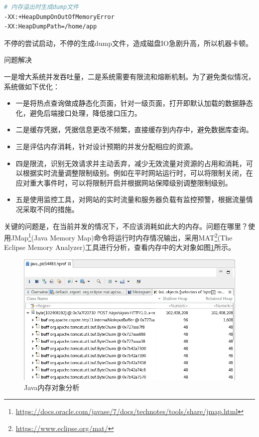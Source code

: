 \documentclass[8pt]{book}
\makeatletter
\numberwithin{dummy}{section}
\theoremstyle{ocrenumbox}
\theoremstyle{blacknumex}
\theoremstyle{blacknumbox}
\theoremstyle{ocrenum}
\renewcommand\paragraph{\@startsection{paragraph}{4}{\z@}
	{-2ex \@plus-.2ex \@minus .2ex}
	{.1ex}
	{\normalfont\small\sffamily\bfseries}}
\makeatother
\begin{document}
\begin{lstlisting}[language=Bash]
# 内存溢出时生成dump文件
-XX:+HeapDumpOnOutOfMemoryError 
-XX:HeapDumpPath=/home/app
\end{lstlisting}

不停的尝试启动，不停的生成dump文件，造成磁盘IO急剧升高，所以机器卡顿。

\paragraph{问题解决}

一是增大系统并发吞吐量，二是系统需要有限流和熔断机制。为了避免类似情况，系统做如下优化：

\begin{itemize}
	\item {一是将热点查询做成静态化页面，针对一级页面，打开即默认加载的数据静态化，避免后端接口处理，降低接口压力。}
	\item {二是缓存凭据，凭据信息更改不频繁，直接缓存到内存中，避免数据库查询。}
	\item {三是评估内存消耗，针对设计预期的并发分配相应的资源。}
	\item{四是限流，识别无效请求并主动丢弃，减少无效流量对资源的占用和消耗，可以根据实时流量调整限制级别。例如在平时网站运行时，可以将限制关闭，在应对重大事件时，可以将限制开启并根据网站保障级别调整限制级别。}
	\item {五是使用监控工具，对网站的实时流量和服务器负载有监控预警，根据流量情况采取不同的措施。}
\end{itemize}

关键的问题是，在当前并发的情况下，不应该消耗如此大的内存。问题在哪里？使用JMap\footnote{\url{https://docs.oracle.com/javase/7/docs/technotes/tools/share/jmap.html}}(Java Memory Map)命令将运行时内存情况输出，采用MAT\footnote{\url{https://www.eclipse.org/mat/}}(The Eclipse Memory Analyzer)工具进行分析，查看内存中的大对象如图\ref{fig:javahprofanalysis}所示。

\begin{figure}[htbp]
	\centering
	\includegraphics[scale=0.3]{javahprofanalysis.png}
	\caption{Java内存对象分析}
	\label{fig:javahprofanalysis}
\end{figure}
\end{document}
